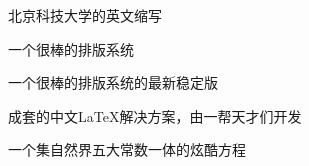 
\begin{symbols}
  \item[USTB] 北京科技大学的英文缩写
  \item[\LaTeX] 一个很棒的排版系统
  \item[\LaTeXe] 一个很棒的排版系统的最新稳定版
  \item[ctex] 成套的中文\LaTeX{}解决方案，由一帮天才们开发
  \item[$ e^{\pi{}i}+1=0$] 一个集自然界五大常数一体的炫酷方程
\end{symbols}
